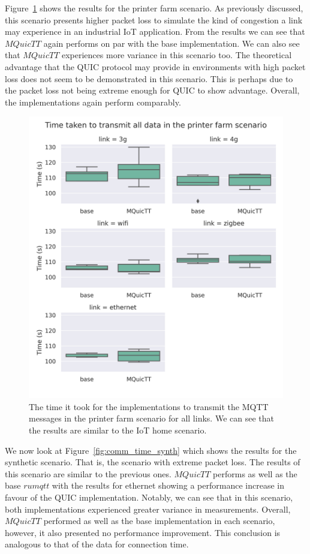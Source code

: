 Figure~\ref{fig:comm_time_farm} shows the results for the printer farm scenario.
As previously discussed, this scenario presents higher packet loss to simulate the kind of congestion a link may experience in an industrial IoT application.
From the results we can see that $MQuicTT$ again performs on par with the base implementation.
We can also see that $MQuicTT$ experiences more variance in this scenario too.
The theoretical advantage that the QUIC protocol may provide in environments with high packet loss does not seem to be demonstrated in this scenario.
This is perhaps due to the packet loss not being extreme enough for QUIC to show advantage.
Overall, the implementations again perform comparably.

\begin{figure}
    \centering
    \includegraphics[width=1\linewidth]{images/analysis_comm_time_farm.png}
    \caption{The time it took for the implementations to transmit the MQTT messages in the printer farm scenario for all links.
        We can see that the results are similar to the IoT home scenario.}
    \label{fig:comm_time_farm}
\end{figure}

We now look at Figure~\ref{fig:comm_time_synth} which shows the results for the synthetic scenario.
That is, the scenario with extreme packet loss.
The results of this scenario are similar to the previous ones.
$MQuicTT$ performs as well as the base $rumqtt$ with the results for ethernet showing a performance increase in favour of the QUIC implementation.
Notably, we can see that in this scenario, both implementations experienced greater variance in measurements.
Overall, $MQuicTT$ performed as well as the base implementation in each scenario, however, it also presented no performance improvement.
This conclusion is analogous to that of the data for connection time.

